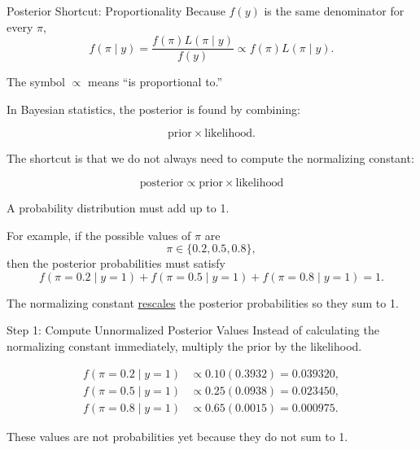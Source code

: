 \documentclass[12pt]{beamer}
\begin{document}
\begin{frame}{}
\begin{block}{Posterior Shortcut: Proportionality}
Because $f(y)$ is the same denominator for every $\pi$,
\[
f(\pi\mid y)=\frac{f(\pi)L(\pi\mid y)}{f(y)} \propto f(\pi)L(\pi\mid y).
\]

\vspace{0.4cm}
The symbol $\propto$ means ``is proportional to.''
\end{block}
\end{frame}

\begin{frame}{}
\begin{block}{}
In Bayesian statistics, the posterior is found by combining:

\[
\text{prior} \times \text{likelihood}.
\]

\vspace{0.4cm}
The shortcut is that we do not always need to compute the normalizing constant:

\vspace{0.4cm}
\[
\boxed{\text{posterior} \propto \text{prior} \times \text{likelihood}}
\]
\end{block}
\end{frame}

\begin{frame}{}
A probability distribution must add up to 1.

\vspace{0.3cm}
For example, if the possible values of $\pi$ are
\[
\pi \in \{0.2, 0.5, 0.8\},
\]
then the posterior probabilities must satisfy
\[
f(\pi = 0.2 \mid y = 1)
+ f(\pi = 0.5 \mid y = 1)
+ f(\pi = 0.8 \mid y = 1)
= 1.
\]

\vspace{0.3cm}
The normalizing constant \ul{rescales} the posterior probabilities so they sum to 1.
\end{frame}

\begin{frame}{}
\begin{block}{Step 1: Compute Unnormalized Posterior Values}
Instead of calculating the normalizing constant immediately, multiply the prior by the likelihood.

\[
\begin{aligned}
f(\pi = 0.2 \mid y = 1) &\propto 0.10(0.3932) = 0.039320, \\
f(\pi = 0.5 \mid y = 1) &\propto 0.25(0.0938) = 0.023450, \\
f(\pi = 0.8 \mid y = 1) &\propto 0.65(0.0015) = 0.000975.
\end{aligned}
\]

\vspace{0.3cm}
These values are not probabilities yet because they do not sum to 1.
\end{block}
\end{frame}
\end{document}
